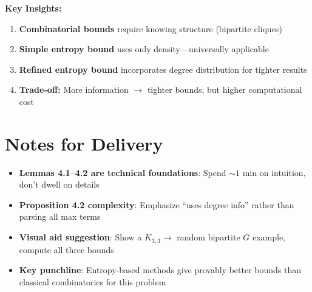 \documentclass[12pt,a4paper]{article}
\begin{document}
\textbf{Key Insights:}
\begin{enumerate}
    \item \textbf{Combinatorial bounds} require knowing structure (bipartite cliques)
    \item \textbf{Simple entropy bound} uses only density---universally applicable
    \item \textbf{Refined entropy bound} incorporates degree distribution for tighter results
    \item \textbf{Trade-off:} More information $\to$ tighter bounds, but higher computational cost
\end{enumerate}

\section{Notes for Delivery}

\begin{itemize}
    \item \textbf{Lemmas 4.1--4.2 are technical foundations}: Spend $\sim 1$ min on intuition, don't dwell on details
    \item \textbf{Proposition 4.2 complexity}: Emphasize ``uses degree info'' rather than parsing all max terms
    \item \textbf{Visual aid suggestion}: Show a $K_{3,3} \to$ random bipartite $G$ example, compute all three bounds
    \item \textbf{Key punchline}: Entropy-based methods give provably better bounds than classical combinatorics for this problem
\end{itemize}
\end{document}
